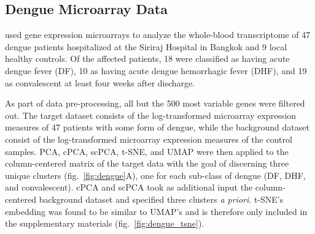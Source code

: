 \subsection{Dengue Microarray Data}\label{dengue_data}

\citet{Kwissa2014} used gene expression microarrays to analyze the whole-blood transcriptome of 47 dengue patients hospitalized at the Siriraj Hospital in Bangkok and 9 local healthy controls. Of the affected patients, 18 were classified as having acute dengue fever (DF), 10 as having acute dengue hemorrhagic fever (DHF), and 19 as convalescent at least four weeks after discharge.

As part of data pre-processing, all but the 500 most variable genes were filtered out. The target dataset consists of the log-transformed microarray expression measures of 47 patients with some form of dengue, while the background dataset consist of the log-transformed microarray expression measures of the control samples. PCA, cPCA, scPCA, t-SNE, and UMAP were then applied to the column-centered matrix of the target data with the goal of discerning three unique clusters (fig.~\ref{fig:dengue}A), one for each sub-class of dengue (DF, DHF, and convalescent). cPCA and scPCA took as additional input the column-centered background dataset and specified three clusters \textit{a priori}. t-SNE's embedding was found to be similar to UMAP's and is therefore only included in the supplementary materials (fig.~\ref{fig:dengue_tsne}).
\FloatBarrier
